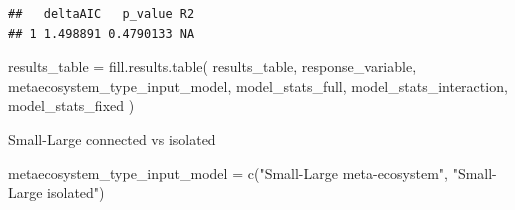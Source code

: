 \documentclass[
]{article}
\newenvironment{Shaded}{\begin{snugshade}}{\end{snugshade}}
\newcommand{\FunctionTok}[1]{\textcolor[rgb]{0.00,0.00,0.00}{#1}}
\newcommand{\NormalTok}[1]{#1}
\newcommand{\OtherTok}[1]{\textcolor[rgb]{0.56,0.35,0.01}{#1}}
\newcommand{\StringTok}[1]{\textcolor[rgb]{0.31,0.60,0.02}{#1}}
\begin{document}
\begin{verbatim}
##   deltaAIC   p_value R2
## 1 1.498891 0.4790133 NA
\end{verbatim}

\begin{Shaded}
\begin{Highlighting}[]
\NormalTok{results\_table }\OtherTok{=} \FunctionTok{fill.results.table}\NormalTok{(}
\NormalTok{  results\_table,}
\NormalTok{  response\_variable,}
\NormalTok{  metaecosystem\_type\_input\_model,}
\NormalTok{  model\_stats\_full,}
\NormalTok{  model\_stats\_interaction,}
\NormalTok{  model\_stats\_fixed}
\NormalTok{)}
\end{Highlighting}
\end{Shaded}

Small-Large connected vs isolated

\begin{Shaded}
\begin{Highlighting}[]
\NormalTok{metaecosystem\_type\_input\_model }\OtherTok{=} \FunctionTok{c}\NormalTok{(}\StringTok{"Small{-}Large meta{-}ecosystem"}\NormalTok{,}
                                   \StringTok{"Small{-}Large isolated"}\NormalTok{)}
\end{Highlighting}
\end{Shaded}
\end{document}
